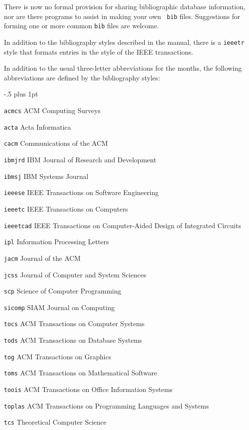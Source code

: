  
There is now no formal provision for sharing bibliographic database
information, nor are there programs to assist in making your own {\tt
bib} files.  Suggestions for forming one or more common {\tt bib} files
are welcome.
 
In addition to the bibliography styles described in the manual, there
is a {\tt ieeetr} style that formats entries in the style of the IEEE
transactions.
 
In addition to the usual three-letter abbreviations for the months, the
following abbreviations are defined by the bibliography styles:
\begin{list}{}{ \itemindent-.5\leftmargin
       \itemsep=2pt plus 1pt
       \let\makelabel\descriptionlabel}\it
\item[\tt acmcs] ACM Computing Surveys
\item[\tt acta] Acta Informatica
\item[\tt cacm] Communications of the ACM
\item[\tt ibmjrd] IBM Journal of Research and Development
\item[\tt ibmsj] IBM Systems Journal
\item[\tt ieeese] IEEE Transactions on Software Engineering
\item[\tt ieeetc] IEEE Transactions on Computers
\item[\tt ieeetcad]
 IEEE Transactions on Computer-Aided Design of Integrated Circuits
\item[\tt ipl] Information Processing Letters
\item[\tt jacm] Journal of the ACM
\item[\tt jcss] Journal of Computer and System Sciences
\item[\tt scp] Science of Computer Programming
\item[\tt sicomp] SIAM Journal on Computing
\item[\tt tocs] ACM Transactions on Computer Systems
\item[\tt tods] ACM Transactions on Database Systems
\item[\tt tog] ACM Transactions on Graphics
\item[\tt toms] ACM Transactions on Mathematical Software
\item[\tt toois] ACM Transactions on Office Information Systems
\item[\tt toplas] ACM Transactions on Programming Languages and Systems
\item[\tt tcs] Theoretical Computer Science
\end{list}
 
